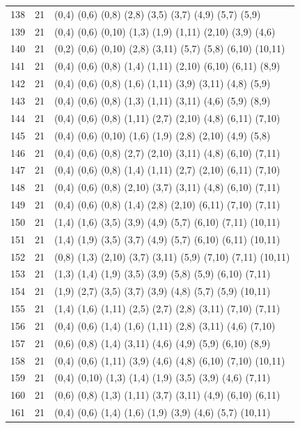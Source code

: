 {\begin{longtable}{lll}
138 & 21 & (0,4) (0,6) (0,8) (2,8) (3,5) (3,7) (4,9) (5,7) (5,9) \\
139 & 21 & (0,4) (0,6) (0,10) (1,3) (1,9) (1,11) (2,10) (3,9) (4,6) \\
140 & 21 & (0,2) (0,6) (0,10) (2,8) (3,11) (5,7) (5,8) (6,10) (10,11) \\
141 & 21 & (0,4) (0,6) (0,8) (1,4) (1,11) (2,10) (6,10) (6,11) (8,9) \\
142 & 21 & (0,4) (0,6) (0,8) (1,6) (1,11) (3,9) (3,11) (4,8) (5,9) \\
143 & 21 & (0,4) (0,6) (0,8) (1,3) (1,11) (3,11) (4,6) (5,9) (8,9) \\
144 & 21 & (0,4) (0,6) (0,8) (1,11) (2,7) (2,10) (4,8) (6,11) (7,10) \\
145 & 21 & (0,4) (0,6) (0,10) (1,6) (1,9) (2,8) (2,10) (4,9) (5,8) \\
146 & 21 & (0,4) (0,6) (0,8) (2,7) (2,10) (3,11) (4,8) (6,10) (7,11) \\
147 & 21 & (0,4) (0,6) (0,8) (1,4) (1,11) (2,7) (2,10) (6,11) (7,10) \\
148 & 21 & (0,4) (0,6) (0,8) (2,10) (3,7) (3,11) (4,8) (6,10) (7,11) \\
149 & 21 & (0,4) (0,6) (0,8) (1,4) (2,8) (2,10) (6,11) (7,10) (7,11) \\
150 & 21 & (1,4) (1,6) (3,5) (3,9) (4,9) (5,7) (6,10) (7,11) (10,11) \\
151 & 21 & (1,4) (1,9) (3,5) (3,7) (4,9) (5,7) (6,10) (6,11) (10,11) \\
152 & 21 & (0,8) (1,3) (2,10) (3,7) (3,11) (5,9) (7,10) (7,11) (10,11) \\
153 & 21 & (1,3) (1,4) (1,9) (3,5) (3,9) (5,8) (5,9) (6,10) (7,11) \\
154 & 21 & (1,9) (2,7) (3,5) (3,7) (3,9) (4,8) (5,7) (5,9) (10,11) \\
155 & 21 & (1,4) (1,6) (1,11) (2,5) (2,7) (2,8) (3,11) (7,10) (7,11) \\
156 & 21 & (0,4) (0,6) (1,4) (1,6) (1,11) (2,8) (3,11) (4,6) (7,10) \\
157 & 21 & (0,6) (0,8) (1,4) (3,11) (4,6) (4,9) (5,9) (6,10) (8,9) \\
158 & 21 & (0,4) (0,6) (1,11) (3,9) (4,6) (4,8) (6,10) (7,10) (10,11) \\
159 & 21 & (0,4) (0,10) (1,3) (1,4) (1,9) (3,5) (3,9) (4,6) (7,11) \\
160 & 21 & (0,6) (0,8) (1,3) (1,11) (3,7) (3,11) (4,9) (6,10) (6,11) \\
161 & 21 & (0,4) (0,6) (1,4) (1,6) (1,9) (3,9) (4,6) (5,7) (10,11) \\

\end{longtable}}
